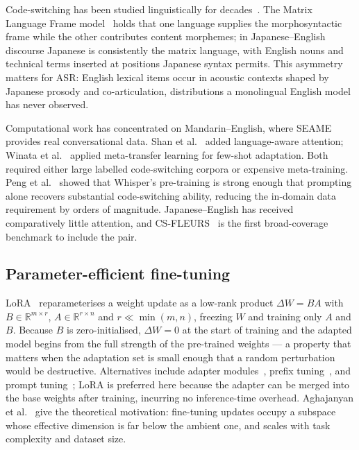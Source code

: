 \documentclass[11pt,a4paper]{article}
\begin{document}
Code-switching has been studied linguistically for
decades~\cite{poplack1980,myersscotton1993}. The Matrix Language Frame
model~\cite{myersscotton1993} holds that one language supplies the morphosyntactic
frame while the other contributes content morphemes; in Japanese--English
discourse Japanese is consistently the matrix language, with English nouns and
technical terms inserted at positions Japanese syntax permits. This asymmetry
matters for ASR: English lexical items occur in acoustic contexts shaped by
Japanese prosody and co-articulation, distributions a monolingual English model
has never observed.

Computational work has concentrated on Mandarin--English, where
SEAME~\cite{lyu2010seame} provides real conversational data. Shan et
al.~\cite{shan2019cs} added language-aware attention; Winata et
al.~\cite{winata2020meta} applied meta-transfer learning for few-shot adaptation.
Both required either large labelled code-switching corpora or expensive
meta-training. Peng et al.~\cite{peng2023prompting} showed that Whisper's
pre-training is strong enough that prompting alone recovers substantial
code-switching ability, reducing the in-domain data requirement by orders of
magnitude. Japanese--English has received comparatively little attention, and
CS-FLEURS~\cite{yan2025csfleurs} is the first broad-coverage benchmark to include
the pair.

\subsection{Parameter-efficient fine-tuning}

LoRA~\cite{hu2021lora} reparameterises a weight update as a low-rank product
$\Delta W = BA$ with $B \in \mathbb{R}^{m \times r}$, $A \in \mathbb{R}^{r \times
n}$ and $r \ll \min(m,n)$, freezing $W$ and training only $A$ and $B$. Because
$B$ is zero-initialised, $\Delta W = 0$ at the start of training and the adapted
model begins from the full strength of the pre-trained weights --- a property that
matters when the adaptation set is small enough that a random perturbation would
be destructive. Alternatives include adapter
modules~\cite{houlsby2019adapters}, prefix tuning~\cite{li2021prefix}, and prompt
tuning~\cite{lester2021prompt}; LoRA is preferred here because the adapter can be
merged into the base weights after training, incurring no inference-time
overhead. Aghajanyan et al.~\cite{aghajanyan2020intrinsic} give the theoretical
motivation: fine-tuning updates occupy a subspace whose effective dimension is far
below the ambient one, and scales with task complexity and dataset size.
\end{document}
